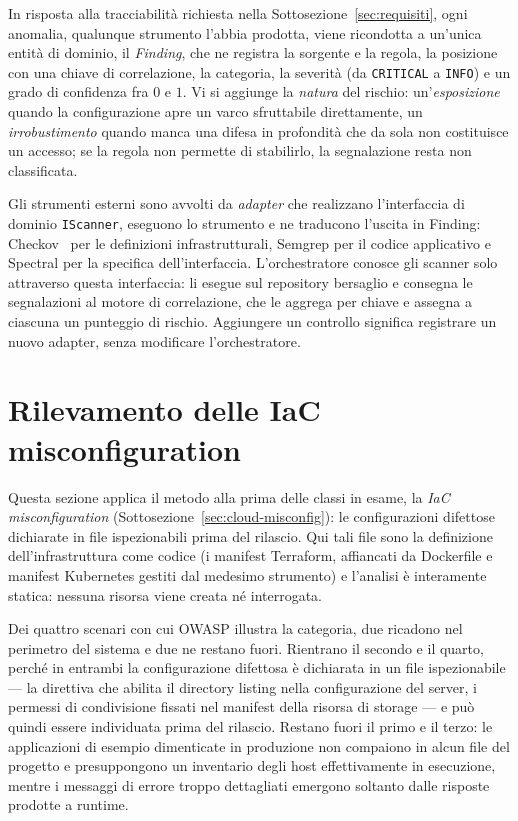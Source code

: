 In risposta alla tracciabilità richiesta nella
Sottosezione~\ref{sec:requisiti}, ogni anomalia, qualunque strumento l'abbia
prodotta, viene ricondotta a un'unica entità di dominio, il \emph{Finding}, che
ne registra la sorgente e la regola, la posizione con una chiave di
correlazione, la categoria, la severità (da \texttt{CRITICAL} a
\texttt{INFO}) e un grado di confidenza fra $0$ e $1$. Vi si aggiunge la
\emph{natura} del rischio: un'\emph{esposizione} quando la configurazione apre
un varco sfruttabile direttamente, un \emph{irrobustimento} quando manca una
difesa in profondità che da sola non costituisce un accesso; se la regola non
permette di stabilirlo, la segnalazione resta non classificata.

Gli strumenti esterni sono avvolti da \emph{adapter} che realizzano
l'interfaccia di dominio \texttt{IScanner}, eseguono lo strumento e ne
traducono l'uscita in Finding: Checkov~\cite{checkov2026docs} per le
definizioni infrastrutturali, Semgrep per il codice applicativo e Spectral per
la specifica dell'interfaccia. L'orchestratore conosce gli scanner solo
attraverso questa interfaccia: li esegue sul repository bersaglio e consegna
le segnalazioni al motore di correlazione, che le aggrega per chiave e assegna
a ciascuna un punteggio di rischio. Aggiungere un controllo significa
registrare un nuovo adapter, senza modificare l'orchestratore.

\section{Rilevamento delle IaC misconfiguration}
\label{sec:rilevamento-misconfig}

Questa sezione applica il metodo alla prima delle classi in esame, la
\emph{IaC misconfiguration} (Sottosezione~\ref{sec:cloud-misconfig}): le
configurazioni difettose dichiarate in file ispezionabili prima del
rilascio. Qui tali file sono la definizione dell'infrastruttura come codice
(i manifest Terraform, affiancati da Dockerfile e manifest Kubernetes gestiti
dal medesimo strumento) e l'analisi è interamente statica: nessuna risorsa
viene creata né interrogata.

Dei quattro scenari con cui OWASP illustra la categoria, due ricadono nel
perimetro del sistema e due ne restano fuori. Rientrano il secondo e il quarto,
perché in entrambi la configurazione difettosa è dichiarata in un file
ispezionabile --- la direttiva che abilita il directory listing nella
configurazione del server, i permessi di condivisione fissati nel manifest
della risorsa di storage --- e può quindi essere individuata prima del
rilascio. Restano fuori il primo e il terzo: le applicazioni di esempio
dimenticate in produzione non compaiono in alcun file del progetto e
presuppongono un inventario degli host effettivamente in esecuzione, mentre i
messaggi di errore troppo dettagliati emergono soltanto dalle risposte prodotte
a runtime.

